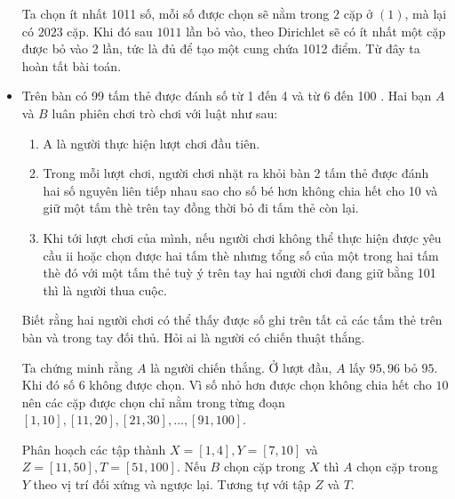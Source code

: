 \documentclass[11pt]{scrartcl}
\begin{document}
\begin{itemize}[label=, leftmargin=0em, itemsep=0.5em]
\begin{sol}
             Ta chọn ít nhất 1011 số, mỗi số được chọn sẽ nằm trong $2$ cặp ở $(1)$, mà lại có $2023$ cặp. Khi đó sau $1011$ lần bỏ vào, theo Dirichlet sẽ có ít nhất một cặp được bỏ vào 2 lần, tức là đủ để tạo một cung chứa 1012 điểm. Từ đây ta hoàn tất bài toán.
        \end{sol}
    \item \begin{bt}
        Trên bàn có 99 tấm thẻ được đánh số từ 1 đến 4 và từ 6 đến 100 . Hai bạn $A$ và $B$ luân phiên chơi trò chơi với luật như sau:
        \begin{enumerate}
            \item A là người thực hiện lượt chơi đầu tiên.
            \item Trong mỗi lượt chơi, người chơi nhặt ra khỏi bàn 2 tấm thẻ được đánh hai số nguyên liên tiếp nhau sao cho số bé hơn không chia hết cho 10 và giữ một tấm thè trên tay đồng thời bỏ đi tấm thẻ còn lại.
            \item Khi tới lượt chơi của mình, nếu người chơi không thể thực hiện được yêu cầu ii hoặc chọn được hai tấm thè nhưng tổng số của một trong hai tấm thè đó với một tấm thẻ tuỳ ý trên tay hai người chơi đang giữ bằng 101 thì là người thua cuộc.
        \end{enumerate}
        Biết rằng hai người chơi có thể thấy được số ghi trên tất cả các tấm thẻ trên bàn và trong tay đối thủ. Hỏi ai là người có chiến thuật thắng.
    \end{bt}
    \begin{sol}
        Ta chứng minh rằng $A$ là người chiến thắng. Ở lượt đầu, $A$ lấy $95,96$ bỏ $95$. Khi đó số $6$ không được chọn. Vì số nhỏ hơn được chọn không chia hết cho $10$ nên các cặp được chọn chỉ nằm trong từng đoạn $[1,10],[11,20],[21,30],\dots,[91,100]$. 
        
        Phân hoạch các tập thành $X = [1,4],Y = [7,10]$ và $Z = [11,50],T= [51,100]$. Nếu $B$ chọn cặp trong $X$ thì $A$ chọn cặp trong $Y$ theo vị trí đối xứng và ngược lại. Tương tự với tập $Z$ và $T$.
    \end{sol}
    



\end{itemize}
\end{document}
